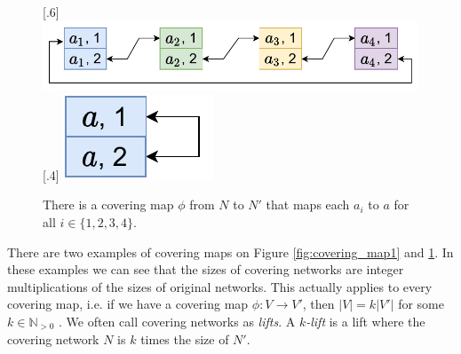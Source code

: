 \begin{figure}[H]
    [.6\linewidth] {
    \centering
    \includegraphics[scale=0.55]{diagrams/covering_map_3.pdf}
  }%
    [.4\linewidth] {
    \centering
    \includegraphics[scale=0.55]{diagrams/covering_map_4.pdf}
  }
  \caption{There is a covering map $\phi$ from $N$ to $N'$ that maps each $a_i$ to $a$ for all $i \in \{1, 2, 3, 4\}$.
  }
  \label{fig:covering_map2}
\end{figure}

There are two examples of covering maps on Figure \ref{fig:covering_map1} and \ref{fig:covering_map2}.
In these examples we can see that the sizes of covering networks are integer multiplications of the sizes of original networks.
This actually applies to every covering map, i.e. if we have a covering map $\phi\colon V \rightarrow V'$, then $|V| = k|V'|$ for some $k \in \mathbb{N}_{>0}$ \cite{DBLP:journals/dm/GrossT77}.
We often call covering networks as \emph{lifts}.
A \emph{$k$-lift} is a lift where the covering network $N$ is $k$ times the size of $N'$.





